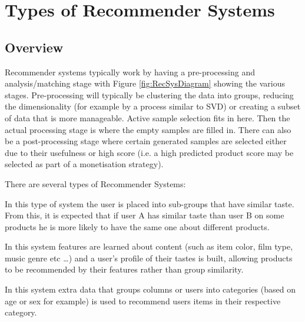 \section{Types of Recommender Systems}


\subsection{Overview}
Recommender systems typically work by having a pre-processing and analysis/matching stage with Figure \ref{fig:RecSysDiagram} showing the various stages. Pre-processing will typically be clustering the data into groups, reducing the dimensionality (for example by a process similar to SVD) or creating a subset of data that is more manageable. Active sample selection fits in here. Then the actual processing stage is where the empty samples are filled in. There can also be a post-processing stage where certain generated samples are selected either due to their usefulness or high score (i.e. a high predicted product score may be selected as part of a monetisation strategy). 


There are several types of Recommender Systems:
\begin{description}[style=standard,leftmargin=.5cm,font=\bfseries]
\item[Collaborative Filtering] In this type of system the user is placed into sub-groups that have similar taste. From this, it is expected that if user A has similar taste than user B on some products he is more likely to have the same one about different products.
\item[Content-based filtering] In this system features are learned about content (such as item color, film type, music genre etc \ldots) and a user's profile of their tastes is built, allowing products to be recommended by their features rather than group similarity.
\item[Demographic Based] In this system extra data that groups columns or users into categories (based on age or sex for example) is used to recommend users items in their respective category.
\end{description}

